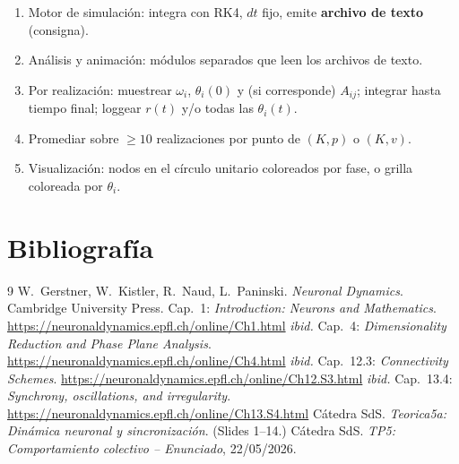 \documentclass[11pt,a4paper]{article}
\begin{document}
\begin{enumerate}
  \item Motor de simulación: integra con RK4, $dt$ fijo, emite \textbf{archivo de texto} (consigna).
  \item Análisis y animación: módulos separados que leen los archivos de texto.
  \item Por realización: muestrear $\omega_i$, $\theta_i(0)$ y (si corresponde) $A_{ij}$; integrar hasta tiempo final; loggear $r(t)$ y/o todas las $\theta_i(t)$.
  \item Promediar sobre $\geq 10$ realizaciones por punto de $(K,p)$ o $(K,v)$.
  \item Visualización: nodos en el círculo unitario coloreados por fase, o grilla coloreada por $\theta_i$.
\end{enumerate}

\section*{Bibliografía}
\begin{thebibliography}{9}
 W.~Gerstner, W.~Kistler, R.~Naud, L.~Paninski. \emph{Neuronal Dynamics}. Cambridge University Press. Cap.~1: \emph{Introduction: Neurons and Mathematics}. \url{https://neuronaldynamics.epfl.ch/online/Ch1.html}
 \emph{ibid.} Cap.~4: \emph{Dimensionality Reduction and Phase Plane Analysis}. \url{https://neuronaldynamics.epfl.ch/online/Ch4.html}
 \emph{ibid.} Cap.~12.3: \emph{Connectivity Schemes}. \url{https://neuronaldynamics.epfl.ch/online/Ch12.S3.html}
 \emph{ibid.} Cap.~13.4: \emph{Synchrony, oscillations, and irregularity}. \url{https://neuronaldynamics.epfl.ch/online/Ch13.S4.html}
 Cátedra SdS. \emph{Teorica5a: Dinámica neuronal y sincronización}. (Slides 1--14.)
 Cátedra SdS. \emph{TP5: Comportamiento colectivo -- Enunciado}, 22/05/2026.
\end{thebibliography}
\end{document}

